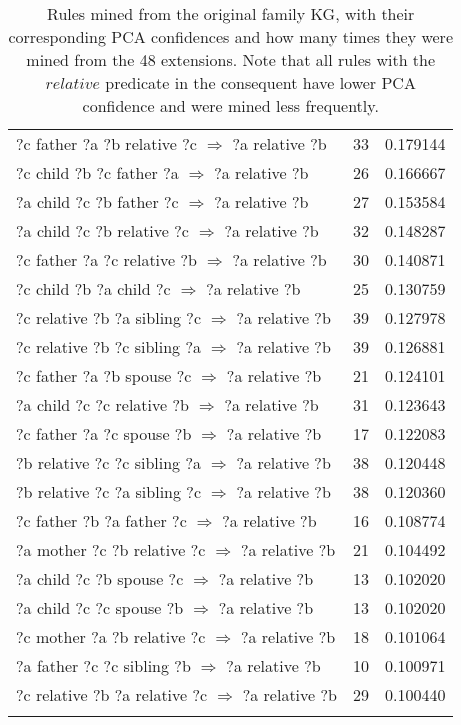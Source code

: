 \begin{longtable}{lrr}
  ?c  father  ?a  ?b  relative  ?c   $\Rightarrow$ ?a  relative  ?b &           33 &        0.179144 \\
     ?c  child  ?b  ?c  father  ?a   $\Rightarrow$ ?a  relative  ?b &           26 &        0.166667 \\
     ?a  child  ?c  ?b  father  ?c   $\Rightarrow$ ?a  relative  ?b &           27 &        0.153584 \\
   ?a  child  ?c  ?b  relative  ?c   $\Rightarrow$ ?a  relative  ?b &           32 &        0.148287 \\
  ?c  father  ?a  ?c  relative  ?b   $\Rightarrow$ ?a  relative  ?b &           30 &        0.140871 \\
      ?c  child  ?b  ?a  child  ?c   $\Rightarrow$ ?a  relative  ?b &           25 &        0.130759 \\
 ?c  relative  ?b  ?a  sibling  ?c   $\Rightarrow$ ?a  relative  ?b &           39 &        0.127978 \\
 ?c  relative  ?b  ?c  sibling  ?a   $\Rightarrow$ ?a  relative  ?b &           39 &        0.126881 \\
    ?c  father  ?a  ?b  spouse  ?c   $\Rightarrow$ ?a  relative  ?b &           21 &        0.124101 \\
   ?a  child  ?c  ?c  relative  ?b   $\Rightarrow$ ?a  relative  ?b &           31 &        0.123643 \\
    ?c  father  ?a  ?c  spouse  ?b   $\Rightarrow$ ?a  relative  ?b &           17 &        0.122083 \\
 ?b  relative  ?c  ?c  sibling  ?a   $\Rightarrow$ ?a  relative  ?b &           38 &        0.120448 \\
 ?b  relative  ?c  ?a  sibling  ?c   $\Rightarrow$ ?a  relative  ?b &           38 &        0.120360 \\
    ?c  father  ?b  ?a  father  ?c   $\Rightarrow$ ?a  relative  ?b &           16 &        0.108774 \\
  ?a  mother  ?c  ?b  relative  ?c   $\Rightarrow$ ?a  relative  ?b &           21 &        0.104492 \\
     ?a  child  ?c  ?b  spouse  ?c   $\Rightarrow$ ?a  relative  ?b &           13 &        0.102020 \\
     ?a  child  ?c  ?c  spouse  ?b   $\Rightarrow$ ?a  relative  ?b &           13 &        0.102020 \\
  ?c  mother  ?a  ?b  relative  ?c   $\Rightarrow$ ?a  relative  ?b &           18 &        0.101064 \\
   ?a  father  ?c  ?c  sibling  ?b   $\Rightarrow$ ?a  relative  ?b &           10 &        0.100971 \\
?c  relative  ?b  ?a  relative  ?c   $\Rightarrow$ ?a  relative  ?b &           29 &        0.100440 \\
\bottomrule
\caption[Rules mined from the original family KG]{Rules mined from the original family KG, with their corresponding PCA confidences and how many times they were mined from the 48 extensions. Note that all rules with the $relative$ predicate in the consequent have lower PCA confidence and were mined less frequently.}
\label{family_original_rules_table_PCA}
\end{longtable}